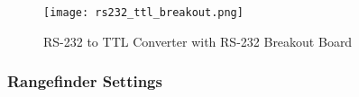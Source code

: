 \begin{figure}[H]
	\centerline{\texttt{[image: rs232\_ttl\_breakout.png]}}
	\caption{RS-232 to TTL Converter with RS-232 Breakout Board}
	\label{rs232_ttl_breakout}
\end{figure}

\subsubsection{Rangefinder Settings}